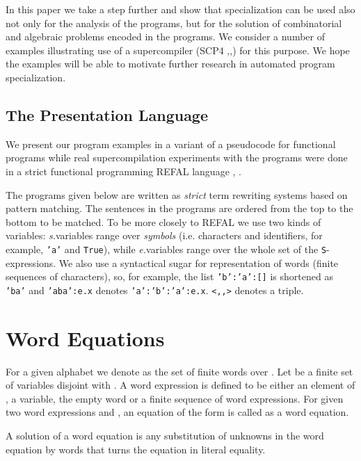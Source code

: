 \documentclass[preprint]{sigplanconf}
\begin{document}
In this paper we take a step further and show that specialization can be used also not only for the analysis of the programs, but  for the solution of combinatorial and algebraic problems encoded in the programs.    We consider a number of examples illustrating use of a supercompiler (SCP4 \cite{N:03},\cite{Nemytykh:SCP4book},\cite{NT:00}) for this purpose.  
We hope the examples will be able 
to motivate further research in automated program specialization. 

\subsection{The Presentation Language}

We present our program examples in a variant of a pseudocode for functional programs 
while real supercompilation experiments with the programs were done in a strict functional programming REFAL language \cite{Turchin:Refal5}, \cite{Refal5:PZ}. 

The programs given below are written as \emph{strict} term rewriting systems based on pattern matching. The sentences in the programs are ordered from the top to the bottom to be matched. 
To be more closely to REFAL 
we use two kinds of variables: \emph{s.}variables range over \emph{symbols} (i.e. characters and identifiers, for example, \texttt{'a'} and \texttt{True}),
while \emph{e.}variables range over the whole set of the \texttt{S}-expressions. 
We also use a syntactical  sugar for representation of words (finite sequences of characters), so,  for example, the list \texttt{'b':'a':[]} is   shortened as \texttt{'ba'} and  \texttt{'aba':e.x} denotes \texttt{'a':'b':'a':e.x}.  
\texttt{<,,>} denotes a triple. 


\section{Word Equations}\label{WordEquations}

For a given alphabet  we denote as  the set of finite words over . Let  be a finite set of variables disjoint with . A word expression is defined to be either an element 
of , a variable, the empty word  or a finite sequence of word expressions. For given two word expressions  and , an equation of the form  is called as a word equation. 

A solution of a word equation is any substitution of unknowns in the word equation by words that turns the equation  
in literal equality. 
\end{document}
